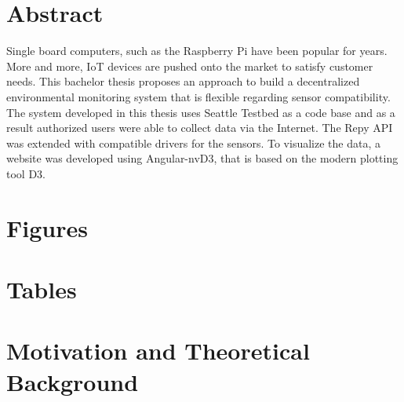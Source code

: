 \documentclass{article}      %
\begin{document}
\section*{Abstract}
{}%

Single board computers, such as the Raspberry Pi have been popular for years. More and more, \gls{IoT} devices are pushed onto the market to satisfy customer needs. This bachelor thesis proposes an approach to build a decentralized environmental monitoring system that is flexible regarding sensor compatibility. The system developed in this thesis uses Seattle Testbed as a code base and as a result authorized users were able to collect data via the Internet. The \gls{Repy} \gls{API} was extended with compatible drivers for the sensors. To visualize the data, a website was developed using Angular-nvD3, that is based on the modern plotting tool D3. 

\newpage

\tableofcontents		%
\newpage

\makeatletter
\begingroup
\let\clearpage\relax
\let\cleardoublepage\relax
{}
{}%
\section*{Figures}
%
\bigskip
{}
{}%
\section*{Tables}
\endgroup
\makeatother

\glsaddall
\begingroup %
	\let\clearpage\relax
	\printglossaries
\endgroup


\cleardoublepage
{}
\setcounter{page}{1}


\section{Motivation and Theoretical Background}
\end{document}
